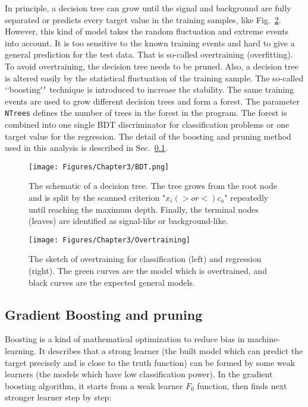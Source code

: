 In principle, a decision tree can grow until the signal and background are fully separated or predicts every target value in the training samples, like Fig.~\ref{fig:Overtraining}.
However, this kind of model takes the random fluctuation and extreme events into account. It is too sensitive to the known training events and hard to give a general prediction for the test data. That is so-called overtraining (overfitting).
To avoid overtraining, the decision tree needs to be pruned. 
Also, a decision tree is altered easily by the statistical fluctuation of the training sample.
The so-called \lq\lq boosting$\rq$$\rq$ technique is introduced to increase the stability.
The same training events are used to grow different decision trees and form a forest.
The parameter \verb|NTrees| defines the number of trees in the forest in the program.
The forest is combined into one single BDT discriminator for classification problems or one target value for the regression.
The detail of the boosting and pruning method used in this analysis is described in Sec.~\ref{ssec:GradBoost}.

\begin{figure}[t]
  \centering
  \texttt{[image: Figures/Chapter3/BDT.png]}
  \caption{The schematic of a decision tree. The tree grows from the root node and is split by the scanned criterion "$x_{i} (> or <) c_{a}$" repeatedly until reaching the maximum depth. Finally, the terminal nodes (leaves) are identified as signal-like or background-like.}
  \label{fig:BDT}
\end{figure}

\begin{figure}[h]
  \centering
  \texttt{[image: Figures/Chapter3/Overtraining]}
  \caption{The sketch of overtraining for classification (left) and regression (right). The green curves are the model which is overtrained, and black curves are the expected general models.}
  \label{fig:Overtraining}
\end{figure}

\subsection{Gradient Boosting and pruning} \label{ssec:GradBoost}

Boosting is a kind of mathematical optimization to reduce bias in machine-learning.
It describes that a strong learner (the built model which can predict the target precisely and is close to the truth function) can be formed by some weak learners (the models which have low classification power).
In the gradient boosting algorithm, it starts from a weak learner $F_{0}$ function, then finds next stronger learner step by step:

